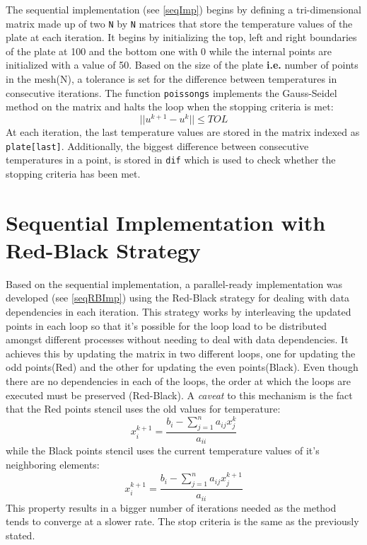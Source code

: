 \documentclass{article}
\begin{document}
The sequential implementation (see \ref{seqImp}) begins by defining a tri-dimensional matrix made up of two \texttt{N} by \texttt{N} matrices 
that store the temperature values of the plate at each iteration. It begins by initializing the top, left and right boundaries of the plate 
at 100 and the bottom one with 0 while the internal points are initialized with a value of 50. 
Based on the size of the plate \textbf{i.e.} number of points in the mesh(N), a tolerance is set for the difference between temperatures
in consecutive iterations.
The function \texttt{poissongs} implements the Gauss-Seidel method on the matrix and halts the loop when the stopping criteria is met:
$$|| u^{k+1} - u^k|| \leq TOL$$
At each iteration, the last temperature values are stored in the matrix indexed as \texttt{plate[last]}.
Additionally, the biggest difference between consecutive temperatures in a point, is stored in \texttt{dif} which is used to check whether
the stopping criteria has been met. 

\section{Sequential Implementation with Red-Black Strategy}
Based on the sequential implementation, a parallel-ready implementation was developed (see \ref{seqRBImp}) using the Red-Black strategy for dealing 
with data dependencies in each iteration. This strategy works by interleaving the updated points in each loop so that it's possible for
the loop load to be distributed amongst different processes without needing to deal with data dependencies. It achieves this by updating the matrix in two
different loops, one for updating the odd points(Red) and the other for updating the even points(Black). Even though there are no dependencies in
each of the loops, the order at which the loops are executed must be preserved (Red-Black). A \textit{caveat} to this mechanism is the fact that the Red 
points stencil uses the old values for temperature: 
$$x_i^{k+1} = \frac{b_i - \sum_{j=1}^n a_{ij}x_j^k}{a_{ii}}$$
while the Black points stencil uses the current temperature values of it's neighboring elements: 
$$x_i^{k+1} = \frac{b_i - \sum_{j=1}^n a_{ij}x_j^{k+1}}{a_{ii}}$$
This property results in a bigger number of iterations needed as the method tends to converge at a slower rate. The stop criteria is the same as 
the previously stated.
\end{document}
